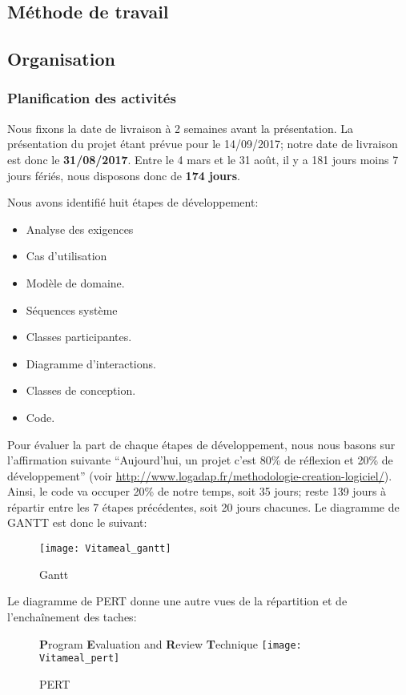 \textcolor[RGB]{46, 116, 181}{\chapter{Méthode de travail}}
\section{Organisation}
\subsection{Planification des activités}
Nous fixons la date de livraison à 2 semaines avant la présentation. La présentation du projet étant prévue pour le 14/09/2017; notre date de livraison est donc le \textbf{31/08/2017}. Entre le 4 mars et le 31 août, il y a 181 jours moins 7 jours fériés, nous disposons donc de \textbf{174 jours}.

Nous avons identifié huit étapes de développement:
\begin{itemize}
	\item Analyse des exigences
	\item Cas d'utilisation
	\item Modèle de domaine.
	\item Séquences système
	\item Classes participantes.
	\item Diagramme d'interactions.
	\item Classes de conception.
	\item Code.
\end{itemize}
Pour évaluer la part de chaque étapes de développement, nous nous basons sur l'affirmation suivante \enquote{Aujourd'hui, un projet c'est 80\% de réflexion et 20\% de développement} (voir \url{http://www.logadap.fr/methodologie-creation-logiciel/}). Ainsi, le code va occuper 20\% de notre temps, soit 35 jours; reste 139 jours à répartir entre les 7 étapes précédentes, soit 20 jours chacunes.
Le diagramme de GANTT est donc le suivant:
\begin{figure}[H]
\label{Gantt}
  \centering
      \texttt{[image: Vitameal\_gantt]} %
\caption{Gantt}
\end{figure}

Le diagramme de PERT donne une autre vues de la répartition et de l'enchaînement des taches:
\begin{figure}[H]
\textbf{P}rogram \textbf{E}valuation and \textbf{R}eview \textbf{T}echnique
\label{PERT}
  \centering
      \texttt{[image: Vitameal\_pert]} %
\caption{PERT}
\end{figure}

